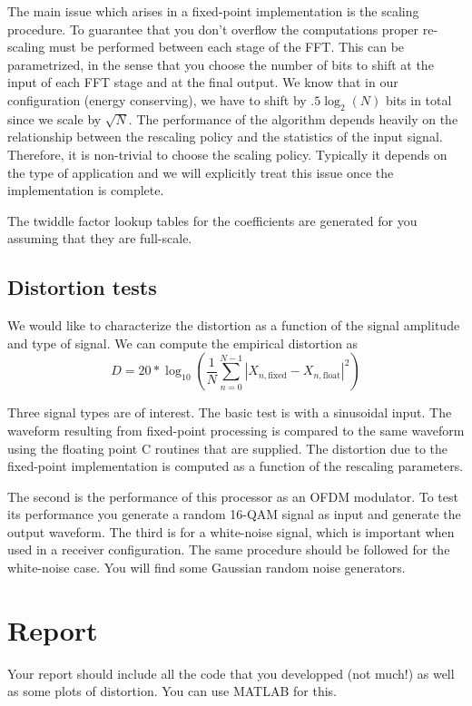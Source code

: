 \documentclass[11pt]{article}
\begin{document}
The main issue which arises in a fixed-point implementation is the scaling procedure.  To guarantee that you don't overflow
the computations proper re-scaling must be performed between each stage of the FFT.  This can be parametrized, in the sense that you choose
the number of bits to shift at the input of each FFT stage and at the final output. We know that in our configuration (energy conserving),
we have to shift by $.5\log_2(N)$ bits in total since we scale by $\sqrt{N}$.    The performance
of the algorithm depends heavily on the relationship between the rescaling policy and the statistics of the input signal.  Therefore,
it is non-trivial to choose the scaling policy.  Typically it depends on the type of application and we will explicitly treat this issue 
once the implementation is complete.

The twiddle factor lookup tables for the coefficients are generated for you assuming that they are full-scale. 



\subsection{Distortion tests}
We would like to characterize the distortion as a function of the signal amplitude and type of signal.  We can compute the empirical distortion as
\begin{equation}
D = 20*\log_{10}\left(\frac{1}{N}\sum_{n=0}^{N-1}|X_{n,\mathrm{fixed}}- X_{n,\mathrm{float}}|^2\right)
\end{equation}
  
Three signal types are of interest.  The basic test is with a sinusoidal input. The waveform resulting from fixed-point processing is compared 
to the same waveform using the floating point C routines that are supplied.  The distortion due to the fixed-point implementation 
is computed as a function of the rescaling parameters.

The second is the performance of this processor as an OFDM modulator. To test its performance you generate a
random 16-QAM signal as input and generate the output waveform.    The third is for a white-noise signal, 
which is important when used in a receiver configuration.  The same procedure should be followed for the 
white-noise case. You will find some Gaussian random noise generators.  

\section{Report}
Your report should include all the code that you developped (not much!) as well as some plots of distortion. You can use MATLAB for this. 
\end{document}
